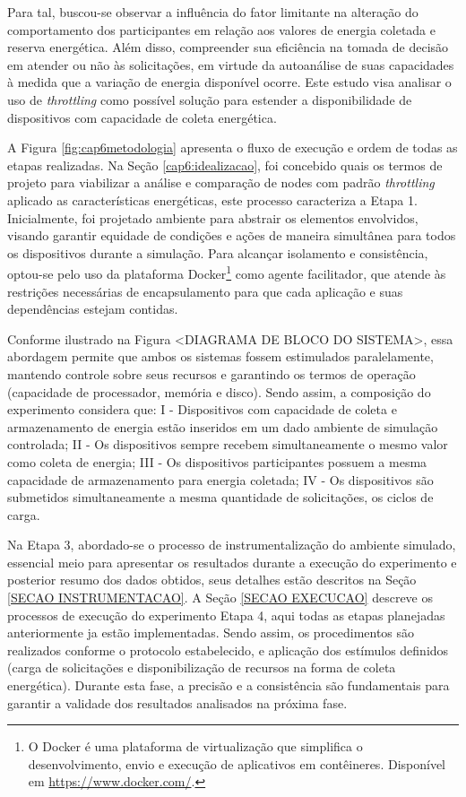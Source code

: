 Para tal, buscou-se observar a influência do fator limitante na alteração do comportamento dos participantes em relação aos valores de energia coletada e reserva energética. Além disso, compreender sua eficiência na tomada de decisão em atender ou não às solicitações, em virtude da autoanálise de suas capacidades à medida que a variação de energia disponível ocorre. Este estudo visa analisar o uso de \textit{throttling} como possível solução para estender a disponibilidade de dispositivos com capacidade de coleta energética. 

A Figura \ref{fig:cap6metodologia} apresenta o fluxo de execução e ordem de todas as etapas realizadas. Na Seção \ref{cap6:idealizacao}, foi concebido quais os termos de projeto para viabilizar a análise e comparação de nodes com padrão \textit{throttling} aplicado as características energéticas, este processo caracteriza a Etapa 1. Inicialmente, foi projetado ambiente para abstrair os elementos envolvidos, visando garantir equidade de condições e ações de maneira simultânea para todos os dispositivos durante a simulação. Para alcançar isolamento e consistência, optou-se pelo uso da plataforma Docker\footnote{O Docker é uma plataforma de virtualização que simplifica o desenvolvimento, envio e execução de aplicativos em contêineres. Disponível em \url{https://www.docker.com/}.} como agente facilitador, que atende às restrições necessárias de encapsulamento para que cada aplicação e suas dependências estejam contidas. 

Conforme ilustrado na Figura <DIAGRAMA DE BLOCO DO SISTEMA>, essa abordagem permite que ambos os sistemas fossem estimulados paralelamente, mantendo controle sobre seus recursos e garantindo os termos de operação (capacidade de processador, memória e disco). Sendo assim, a composição do experimento considera que:  I - Dispositivos com capacidade de coleta e armazenamento de energia estão inseridos em um dado ambiente de simulação controlada; II - Os dispositivos sempre recebem simultaneamente o mesmo valor como coleta de energia; III - Os dispositivos participantes possuem a mesma capacidade de armazenamento para energia coletada; IV - Os dispositivos são submetidos simultaneamente a mesma quantidade de solicitações, os ciclos de carga.

Na Etapa 3, abordado-se o processo de instrumentalização do ambiente simulado, essencial meio para apresentar os resultados durante a execução do experimento e posterior resumo dos dados obtidos, seus detalhes estão descritos na Seção \ref{SECAO INSTRUMENTACAO}. A Seção \ref{SECAO EXECUCAO} descreve os processos de execução do experimento Etapa 4, aqui todas as etapas planejadas anteriormente ja estão implementadas. Sendo assim, os procedimentos são realizados conforme o protocolo estabelecido, e aplicação dos estímulos definidos  (carga de solicitações e disponibilização de recursos na forma de coleta energética). Durante esta fase, a precisão e a consistência são fundamentais para garantir a validade dos resultados analisados na próxima fase. 

